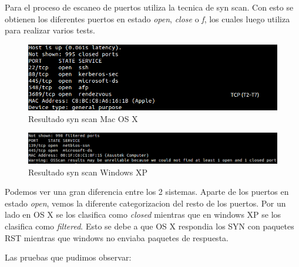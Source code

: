 \documentclass[a4paper]{article}
\begin{document}
Para el proceso de escaneo de puertos utiliza la tecnica de syn scan. Con esto se obtienen los diferentes puertos en estado \textit{open}, \textit{close} o \textit{f}, los cuales luego utiliza para realizar varios tests.


\begin{figure}[H]
  \centering
  \includegraphics[scale=0.60]{graficos/macPorts.png}
  \caption{Resultado syn scan Mac OS X}
\end{figure}  

\begin{figure}[H]
  \centering
  \includegraphics[scale=0.60]{graficos/windowsPorts.png}
  \caption{Resultado syn scan Windows XP}
\end{figure}

Podemos ver una gran diferencia entre los 2 sistemas. Aparte de los puertos en estado \textit{open}, vemos la diferente categorizacion del resto de los puertos. Por un lado en OS X se los clasifica como \textit{closed} mientras que en windows XP se los clasifica como \textit{filtered}. Esto se debe a que OS X respondia los SYN con paquetes RST mientras que windows no enviaba paquetes de respuesta. 
  

Las pruebas que pudimos observar:
\end{document}
